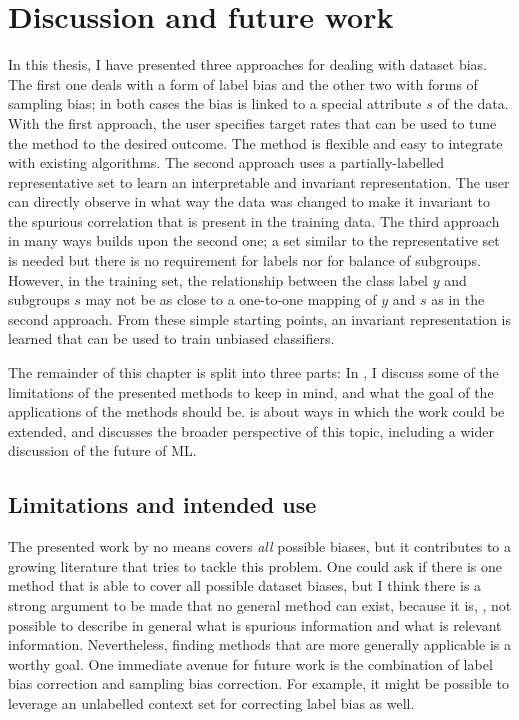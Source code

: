 \chapter{Discussion and future work}\label{ch:conclusion}
In this thesis, I have presented three approaches for dealing with dataset bias.
The first one deals with a form of label bias and the other two with forms of sampling bias;
in both cases the bias is linked to a special attribute \(s\) of the data.
%
%
With the first approach, the user specifies target rates that can be used to tune the method to the desired outcome.
The method is flexible and easy to integrate with existing algorithms.
The second approach uses a partially-labelled representative set to learn an interpretable and invariant representation.
The user can directly observe in what way the data was changed to make it invariant
to the spurious correlation that is present in the training data.
The third approach in many ways builds upon the second one;
a set similar to the representative set is needed but there is no requirement for labels nor for balance of subgroups.
However, in the training set, the relationship between the class label \(y\) and subgroups \(s\) may not be
as close to a one-to-one mapping of \(y\) and \(s\) as in the second approach.
From these simple starting points, an invariant representation is learned
that can be used to train unbiased classifiers.

The remainder of this chapter is split into three parts:
In ,
I discuss some of the limitations of the presented methods to keep in mind,
and what the goal of the applications of the methods should be.
 is about ways in which the work could be extended,
and  discusses the broader perspective of this topic,
including a wider discussion of the future of \acl{ML}.

\section{Limitations and intended use}\label{sec:ch7-limitations}
%
The presented work by no means covers \emph{all} possible biases,
but it contributes to a growing literature that tries to tackle this problem.
One could ask if there is one method that is able to cover all possible dataset biases,
but I think there is a strong argument to be made that no general method can exist,
because it is, \eg, not possible to describe in general what is spurious information and what is relevant information.
Nevertheless, finding methods that are more generally applicable is a worthy goal.
One immediate avenue for future work is
the combination of label bias correction and sampling bias correction.
For example, it might be possible to leverage an unlabelled context set for correcting label bias as well.

